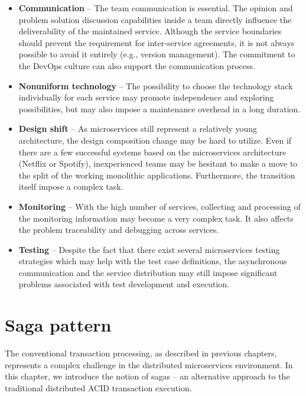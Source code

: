 \documentclass[oneside,
  digital, %
  table,   %
  lof,     %
  lot,     %
]{fithesis3}
\begin{document}
\begin{itemize}
    \item \textbf{Communication} -- The team communication is essential. The opinion and problem solution discussion capabilities inside a team directly influence the deliverability of the maintained service. Although the service boundaries should prevent the requirement for inter-service agreements, it is not always possible to avoid it entirely (e.g., version management). The commitment to the DevOps culture can also support the communication process.
    
    \item \textbf{Nonuniform technology} -- The possibility to choose the technology stack individually for each service may promote independence and exploring possibilities, but may also impose a maintenance overhead in a long duration.  
    
    \item \textbf{Design shift} -- As microservices still represent a relatively young architecture, the design composition change may be hard to utilize. Even if there are a few successful systems based on the microservices architecture (Netflix or Spotify), inexperienced teams may be hesitant to make a move to the split of the working monolithic applications. Furthermore, the transition itself impose a complex task.
    
    \item \textbf{Monitoring} -- With the high number of services, collecting and processing of the monitoring information may become a very complex task. It also affects the problem traceability and debugging across services.
    
    \item \textbf{Testing} -- Despite the fact that there exist several microservices testing strategies \cite{ms_testing_strategies} which may help with the test case definitions, the asynchronous communication and the service distribution may still impose significant problems associated with test development and execution.
\end{itemize}



\clearpage
\chapter{Saga pattern}
\label{sec:saga-pattern}

The conventional transaction processing, as described in previous chapters, represents a complex challenge in the distributed microservices environment. In this chapter, we introduce the notion of sagas -- an alternative approach to the traditional distributed ACID transaction execution.
\end{document}
